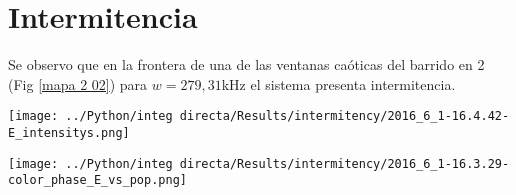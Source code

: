 
\section{Intermitencia}

	Se observo que en la frontera de una de las ventanas caóticas del barrido en 2 (Fig \ref{mapa 2 02}) para $w=279,31$kHz el sistema presenta intermitencia.
	
	\begin{minipage}{0.5\textwidth}
		
		\centering
		\texttt{[image: ../Python/integ directa/Results/intermitency/2016\_6\_1-16.4.42-E\_intensitys.png]}
		
	\end{minipage}
	\begin{minipage}{0.5\textwidth}
		
		\centering
		\texttt{[image: ../Python/integ directa/Results/intermitency/2016\_6\_1-16.3.29-color\_phase\_E\_vs\_pop.png]}
		
	\end{minipage}
	

